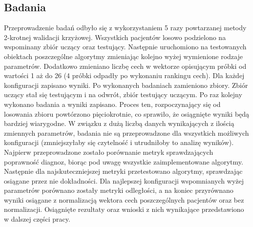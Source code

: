 \documentclass[12pt]{article}
\begin{document}
\subsection{Badania}
\indent  Przeprowadzenie badań odbyło się z wykorzystaniem 5 razy powtarzanej metody 2-krotnej walidacji krzyżowej. Wszystkich pacjentów losowo podzielono na wspominany zbiór uczący oraz testujący. Następnie uruchomiono na testowanych obiektach poszczególne algorytmy zmieniając kolejno wyżej wymienione rodzaje parametrów. Dodatkowo zmieniano liczbę cech w wektorze opisującym próbki od wartości 1 aż do 26 (4 próbki odpadły po wykonaniu rankingu cech). Dla każdej konfiguracji zapisano wyniki. Po wykonanych badaniach zamieniono zbiory. Zbiór uczący stał się testującym i na odwrót, zbiór testujący uczącym. Po raz kolejny wykonano badania a wyniki zapisano. Proces ten, rozpoczynający się od losowania zbioru powtórzono pięciokrotnie, co sprawiło, że osiągnięte wyniki będą bardziej wiarygodne.
\newline
\indent W związku z dużą liczbą danych wynikających z ilością zmiennych parametrów, badania nie są przeprowadzone dla wszystkich możliwych konfiguracji (zmniejszyłaby się czytelność i utrudniłoby to analizę wyników). Najpierw przeprowadzone zostało porównanie metryk sprawdzających poprawność diagnoz, biorąc pod uwagę wszystkie zaimplementowane algorytmy. Następnie dla najskuteczniejszej metryki przetestowano algorytmy, sprawdzając osiągane przez nie dokładności. Dla najlepszej konfiguracji wspomnianych wyżej parametrów porównano zostały metryki odległości, a na koniec przyrównano wyniki osiągane z normalizacją wektora cech poszczególnych pacjentów oraz bez normalizacji. Osiągnięte rezultaty oraz wnioski z nich wynikające przedstawiono w dalszej części pracy.
\newpage

\end{document}
